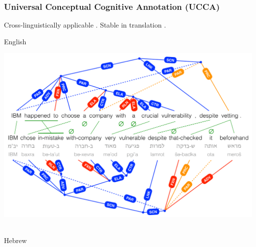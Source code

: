 \documentclass[t,xcolor={svgnames}]{beamer}
\begin{document}
\begin{frame}
\frametitle{Universal Conceptual Cognitive Annotation (UCCA)}
Cross-linguistically applicable \cite{abend2013universal}.
Stable in translation \cite{sulem2015conceptual}.

\vfill
English\\
\vspace{-1cm}
\begin{adjustbox}{center}
  \includegraphics[width=\textwidth,height=\textheight,keepaspectratio]{crosslinguistic.png}
\end{adjustbox}
\\
\vspace{-1cm}
Hebrew
\end{frame}
\end{document}
